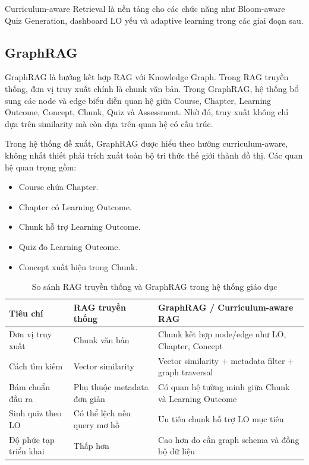 Curriculum-aware Retrieval là nền tảng cho các chức năng như Bloom-aware Quiz
Generation, dashboard LO yếu và adaptive learning trong các giai đoạn sau.

\subsection{GraphRAG}
\label{subsec:graphrag}

GraphRAG là hướng kết hợp RAG với Knowledge Graph. Trong RAG truyền thống, đơn
vị truy xuất chính là chunk văn bản. Trong GraphRAG, hệ thống bổ sung các node
và edge biểu diễn quan hệ giữa Course, Chapter, Learning Outcome, Concept,
Chunk, Quiz và Assessment. Nhờ đó, truy xuất không chỉ dựa trên similarity mà
còn dựa trên quan hệ có cấu trúc.

Trong hệ thống đề xuất, GraphRAG được hiểu theo hướng curriculum-aware, không
nhất thiết phải trích xuất toàn bộ tri thức thế giới thành đồ thị. Các quan hệ
quan trọng gồm:

\begin{itemize}
    \item Course chứa Chapter.
    \item Chapter có Learning Outcome.
    \item Chunk hỗ trợ Learning Outcome.
    \item Quiz đo Learning Outcome.
    \item Concept xuất hiện trong Chunk.
\end{itemize}

\begin{table}[H]
    \centering
    \caption{So sánh RAG truyền thống và GraphRAG trong hệ thống giáo dục}
    \label{tab:rag-vs-graphrag-c3}
    \begin{tabular}{p{3.8cm}p{4.8cm}p{5.2cm}}
        \toprule
        \textbf{Tiêu chí} & \textbf{RAG truyền thống} & \textbf{GraphRAG / Curriculum-aware RAG} \\
        \midrule
        Đơn vị truy xuất & Chunk văn bản & Chunk kết hợp node/edge như LO, Chapter, Concept \\
        Cách tìm kiếm & Vector similarity & Vector similarity + metadata filter + graph traversal \\
        Bám chuẩn đầu ra & Phụ thuộc metadata đơn giản & Có quan hệ tường minh giữa Chunk và Learning Outcome \\
        Sinh quiz theo LO & Có thể lệch nếu query mơ hồ & Ưu tiên chunk hỗ trợ LO mục tiêu \\
        Độ phức tạp triển khai & Thấp hơn & Cao hơn do cần graph schema và đồng bộ dữ liệu \\
        \bottomrule
    \end{tabular}
\end{table}

